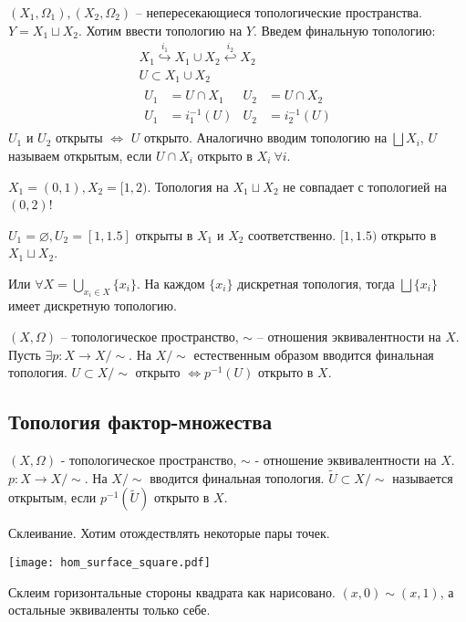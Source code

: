 \documentclass[main]{subfiles}
\begin{document}
\begin{example}
    $(X_1, \Omega_1), (X_2, \Omega_2)$ -- непересекающиеся топологические пространства.
    $Y = X_1 \sqcup X_2$. Хотим ввести топологию на $Y$.
    Введем финальную топологию:
    \begin{gather*}
        X_1 \overset{i_1}{\hookrightarrow} X_1 \cup X_2 \overset{i_2}{\hookleftarrow} X_2\\
        U \subset X_1 \cup X_2\\
        \begin{aligned}
            U_1 & = U \cap X_1  & U_2 & = U \cap X_2  \\
            U_1 & = i^{-1}_1(U) & U_2 & = i^{-1}_2(U)
        \end{aligned}
    \end{gather*}
    $U_1$ и $U_2$ открыты $\Leftrightarrow$ $U$ открыто.
    Аналогично вводим топологию на $\bigsqcup X_i$, $U$ называем открытым, если $U \cap X_i$ открыто в $X_i\ \forall i$.
\end{example}
\begin{remark}
    $X_1 = (0,1), X_2=[1,2)$. Топология на $X_1 \sqcup X_2$ не совпадает с топологией на $(0, 2)$!

    $U_1 = \varnothing, U_2 = [1, 1.5]$ открыты в $X_1$ и $X_2$ соответственно.
    $[1, 1.5)$ открыто в $X_1 \sqcup X_2$.

    Или $\forall X = \bigcup_{x_i \in X} \{x_i\}$.
    На каждом $\{x_i\}$ дискретная топология, тогда $\bigsqcup\{x_i\}$ имеет дискретную топологию.
\end{remark}
\begin{example}
    $(X, \Omega)$ -- топологическое пространство, $\sim$ -- отношения эквивалентности на $X$.
    Пусть $\exists p: X \to X/\sim$.
    На $X/\sim$ естественным образом вводится финальная топология.
    $U \subset X/\sim$ открыто $\Leftrightarrow p^{-1}(U)$ открыто в $X$.
\end{example}

\subsection{Топология фактор-множества}
$(X, \Omega)$ - топологическое пространство, ${\sim}$ - отношение эквивалентности на $X$.
$p: X \to X/{\sim}$. На $X/{\sim}$ вводится финальная топология.
$\tilde{U} \subset X/{\sim}$ называется открытым, если $p^{-1}(\tilde{U})$ открыто в $X$.

\begin{example}
    Склеивание. Хотим отождествлять некоторые пары точек.
\end{example} %
\begin{minipage}{0.3\textwidth}
    \texttt{[image: hom\_surface\_square.pdf]}
\end{minipage}
\begin{minipage}{0.6\textwidth}
    Склеим горизонтальные стороны квадрата как нарисовано.
    $(x,0) \sim (x,1)$, а остальные эквиваленты только себе.
\end{minipage}
\end{document}
